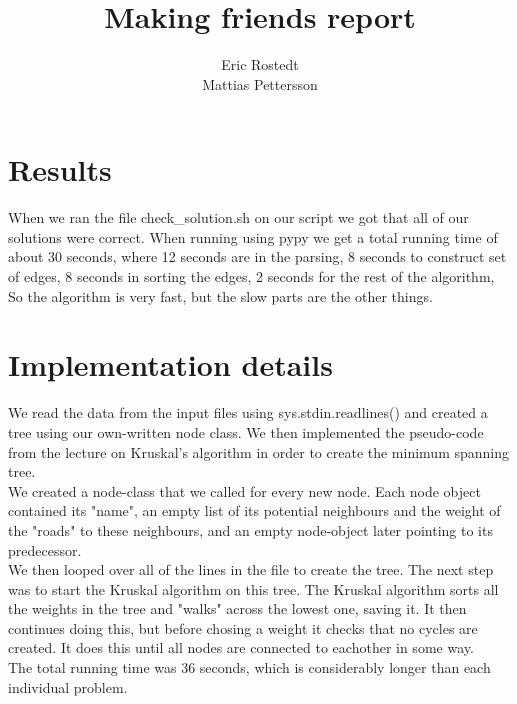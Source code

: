\documentclass{article}
\title{Making friends report}
\author{Eric Rostedt \\ Mattias Pettersson}
\begin{document}
\maketitle

\section{Results}


When we ran the file check\_solution.sh on our script we got that all of our solutions were correct. When running using pypy we get a total running time of about 30 seconds, where 12 seconds are in the parsing, 8 seconds to construct set of edges, 8 seconds in sorting the edges, 2 seconds for the rest of the algorithm, So the algorithm is very fast, but the slow parts are the other things. 

\section{Implementation details}

We read the data from the input files using sys.stdin.readlines() and created a tree using our own-written node class. We then implemented the pseudo-code from the lecture on Kruskal's algorithm in order to create the minimum spanning tree. \\

We created a node-class that we called for every new node. Each node object contained its "name", an empty list of its potential neighbours and the weight of the "roads" to these neighbours, and an empty node-object later pointing to its predecessor.\\

We then looped over all of the lines in the file to create the tree. The next step was to start the Kruskal algorithm on this tree. The Kruskal algorithm sorts all the weights in the tree and "walks" across the lowest one, saving it. It then continues doing this, but before chosing a weight it checks that no cycles are created. It does this until all nodes are connected to eachother in some way.\\

The total running time was 36 seconds, which is considerably longer than each individual problem.\\
\end{document}
